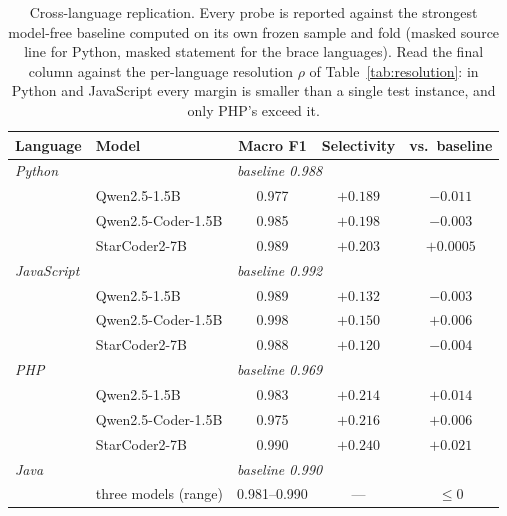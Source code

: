 \begin{table}[t]
\centering
\caption{Cross-language replication. Every probe is reported against the
strongest model-free baseline computed on its own frozen sample and fold
(masked source line for Python, masked statement for the brace
languages). Read the final column against the per-language resolution
$\rho$ of Table~\ref{tab:resolution}: in Python and JavaScript every
margin is smaller than a single test instance, and only PHP's exceed it.}
\label{tab:boolean-crosslang}
\begin{tabular}{llccc}
\toprule
Language & Model & Macro F1 & Selectivity & vs.\ baseline \\
\midrule
\multicolumn{2}{l}{\textit{Python}} & \multicolumn{3}{l}{\emph{baseline 0.988}} \\
 & Qwen2.5-1.5B       & 0.977 & $+0.189$ & $-0.011$ \\
 & Qwen2.5-Coder-1.5B & 0.985 & $+0.198$ & $-0.003$ \\
 & StarCoder2-7B      & 0.989 & $+0.203$ & $+0.0005$ \\
\midrule
\multicolumn{2}{l}{\textit{JavaScript}} & \multicolumn{3}{l}{\emph{baseline 0.992}} \\
 & Qwen2.5-1.5B       & 0.989 & $+0.132$ & $-0.003$ \\
 & Qwen2.5-Coder-1.5B & 0.998 & $+0.150$ & $+0.006$ \\
 & StarCoder2-7B      & 0.988 & $+0.120$ & $-0.004$ \\
\midrule
\multicolumn{2}{l}{\textit{PHP}} & \multicolumn{3}{l}{\emph{baseline 0.969}} \\
 & Qwen2.5-1.5B       & 0.983 & $+0.214$ & $+0.014$ \\
 & Qwen2.5-Coder-1.5B & 0.975 & $+0.216$ & $+0.006$ \\
 & StarCoder2-7B      & 0.990 & $+0.240$ & $+0.021$ \\
\midrule
\multicolumn{2}{l}{\textit{Java}} & \multicolumn{3}{l}{\emph{baseline 0.990}} \\
 & three models (range) & 0.981--0.990 & --- & $\le 0$ \\
\bottomrule
\end{tabular}
\end{table}

